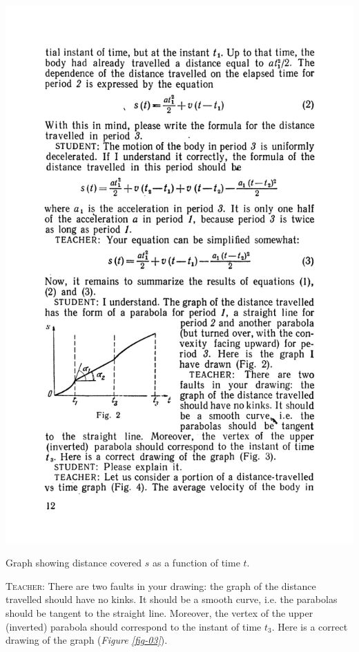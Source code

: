 \documentclass[a4paper,sfsidenotes]{tufte-book}
\begin{document}
\begin{marginfigure}%
\centering
\includegraphics[width=1.1\linewidth]{fig-002.pdf}
\caption{Graph showing distance covered $s$ as a function of time $t$.}
\label{fig-02}
\end{marginfigure}

\textsc{Teacher:} There are two faults in your drawing: the graph of the distance travelled
should have no kinks. It should be a smooth curve, i.e. the parabolas should be tangent to the straight line. Moreover, the vertex of the upper (inverted) parabola should correspond to the instant of time
$t_{3}$. Here is a correct drawing of the graph  (\emph{Figure \ref{fig-03}}).\\
\end{document}
